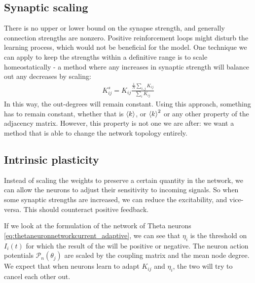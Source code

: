 \subsection{Synaptic scaling}
There is no upper or lower bound on the synapse strength, and generally connection strengths are nonzero. Positive reinforcement loops might disturb the learning process, which would not be beneficial for the model. One technique we can apply to keep the strengths within a definitive range is to scale homeostatically - a method where any increases in synaptic strength will balance out any decreases by scaling:
\begin{align}
K_{ij}^s = K_{ij} \frac{\frac{1}{N} \sum_{i,j} K_{ij}}{\sum_{i} K_{ij}}
\end{align}
In this way, the out-degrees will remain constant. Using this approach, something has to remain constant, whether that is ${\langle k\rangle}$, or ${\langle k\rangle}^2$ or any other property of the adjacency matrix. However, this property is not one we are after: we want a method that is able to change the network topology entirely.


\subsection{Intrinsic plasticity} \label{sec:IP}
Instead of scaling the weights to preserve a certain quantity in the network, we can allow the neurons to adjust their sensitivity to incoming signals. So when some synaptic strengths are increased, we can reduce the excitability, and vice-versa. This should counteract positive feedback. 

If we look at the formulation of the network of Theta neurons \eqref{eq:thetaneuronnetworkcurrent_adaptive}, we can see that $\eta_i$ is the threshold on $I_i(t)$ for which the result of the \PRC will be positive or negative. The neuron action potentials $\mathcal{P}_n(\theta_j)$ are scaled by the coupling matrix and the mean node degree. We expect that when neurons learn to adapt $K_{ij}$ and $\eta_i$, the two will try to cancel each other out.

